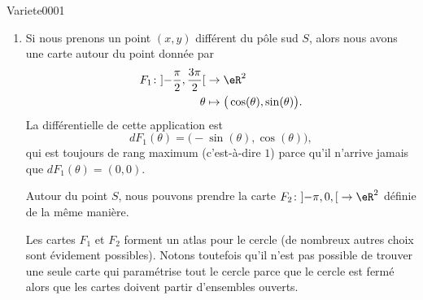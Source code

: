 
\begin{corrige}{Variete0001}

	\begin{enumerate}

		\item
			Si nous prenons un point $(x,y)$ différent du pôle sud $S$, alors nous avons une carte autour du point donnée par
			\begin{equation}
				\begin{aligned}
					F_1\colon \mathopen] -\frac{ \pi }{2} , \frac{ 3\pi }{ 2 } \mathclose[&\to \eR^2 \\
					\theta&\mapsto \big( \cos(\theta),\sin(\theta) \big).
				\end{aligned}
			\end{equation}
			La différentielle de cette application est
			\begin{equation}
				dF_1(\theta)=\big( -\sin(\theta),\cos(\theta) \big),
			\end{equation}
			qui est toujours de rang maximum (c'est-à-dire $1$) parce qu'il n'arrive jamais que $dF_1(\theta)=(0,0)$.

			Autour du point $S$, nous pouvons prendre la carte $F_2\colon \mathopen] -\pi,0 ,  \mathclose[\to \eR^2$ définie de la même manière.
			
			Les cartes $F_1$ et $F_2$ forment un atlas pour le cercle (de nombreux autres choix sont évidement possibles). Notons toutefois qu'il n'est pas possible de trouver une seule carte qui paramétrise tout le cercle parce que le cercle est fermé alors que les cartes doivent partir d'ensembles ouverts.


\end{enumerate}
\end{corrige}

